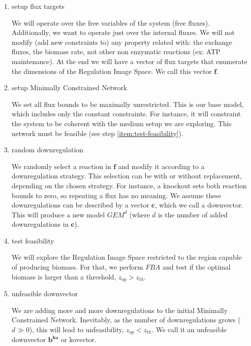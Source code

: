 \documentclass[11pt, letterpaper]{article}
\newcommand{\vecsym}[1]{\boldsymbol{#1}}
\begin{document}
\begin{enumerate}[i]


   \item setup flux targets
   \label{setup flux targets}


   We will operate over the free variables of the system (free fluxes).
   Additionally, we want to operate just over the internal fluxes.
   We will not modify (add new constraints to) any property related with: the exchange fluxes, the biomass rate, not other non enzymatic reactions (ex: ATP maintenance).
   At the end we will have a vector of flux targets that enumerate the dimensions of the Regulation Image Space.
   We call this vector $\vecsym{f}$.


   \item setup Minimally Constrained Network
   \label{item:setup-Minimally-Constrained-Network}


   We set all flux bounds to be maximally unrestricted.
   This is our base model, which includes only the constant constraints.
   For instance, it will constraint the system to be coherent with the medium setup we are exploring.
   This network must be feasible (see step \ref{item:test-feasibility}).


   \item random downregulation
   \label{item:random-downregulation}


   We randomly select a reaction in $\vecsym{f}$ and modify it according to a downregulation strategy.
   This selection can be with or without replacement, depending on the chosen strategy.
   For instance, a knockout sets both reaction bounds to zero, so repeating a flux has no meaning.
   We assume these downregulations can be described by a vector $\vecsym{c}$, which we call a downvector.
   This will produce a new model $GEM^{d}$ (where $d$ is the number of added downregulations in $\vecsym{c}$).


   \item test feasibility
   \label{item:test-feasibility}


   We will explore the Regulation Image Space restricted to the region capable of producing biomass.
   For that, we perform $FBA$ and test if the optimal biomass is larger than a threshold, $z_{op} > z_{th}$.


   \item unfeasible downvector


   We are adding more and more downregulations to the initial Minimally Constrained Network.
   Inevitably, as the number of downregulations grows ($d \gg 0$), this will lead to unfeasibility, $z_{op} < z_{th}$.
   We call it an unfeasible downvector $\vecsym{b^{ko}}$ or kovector.



\end{enumerate}
\end{document}
